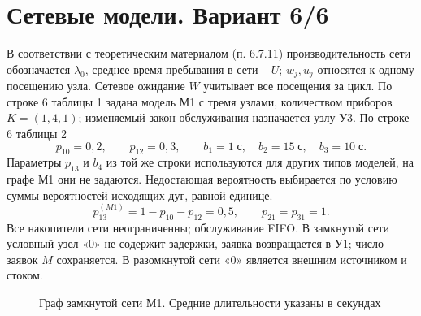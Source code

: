 \documentclass[12pt,a4paper]{article}
\begin{document}
\section{Сетевые модели. Вариант 6/6}
В соответствии с теоретическим материалом (п. 6.7.11) производительность сети обозначается \(\lambda_0\), среднее время пребывания в сети -- \(U\); \(w_j,u_j\) относятся к одному посещению узла. Сетевое ожидание \(W\) учитывает все посещения за цикл.
По строке 6 таблицы 1 задана модель М1 с тремя узлами, количеством приборов \(K=(1,4,1)\); изменяемый закон обслуживания назначается узлу У3. По строке 6 таблицы 2
\begin{equation}
p_{10}=0{,}2,\qquad p_{12}=0{,}3,\qquad
b_1=1\;\text{с},\quad b_2=15\;\text{с},\quad b_3=10\;\text{с}.
\end{equation}
Параметры \(p_{13}\) и \(b_4\) из той же строки используются для других типов моделей, на графе М1 они не задаются. Недостающая вероятность выбирается по условию суммы вероятностей исходящих дуг, равной единице.
\begin{equation}
p_{13}^{(M1)}=1-p_{10}-p_{12}=0{,}5,\qquad p_{21}=p_{31}=1.
\end{equation}
Все накопители сети неограниченны; обслуживание FIFO. В замкнутой сети условный узел «0» не содержит задержки, заявка возвращается в У1; число заявок \(M\) сохраняется. В разомкнутой сети «0» является внешним источником и стоком.
\begin{figure}[H]\centering
{}
\caption{Граф замкнутой сети М1. Средние длительности указаны в секундах}
\end{figure}
\end{document}
